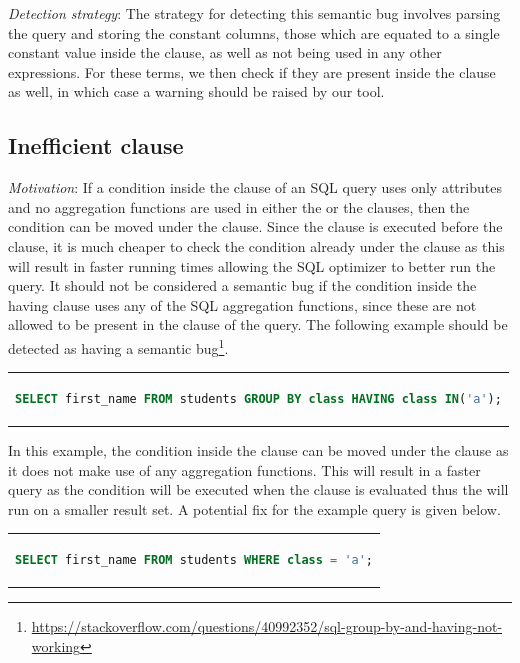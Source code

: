 \noindent \emph{Detection strategy}: The strategy for detecting this semantic bug involves parsing the query and storing the constant columns, those which are equated to a single constant value inside the  clause, as well as not being used in any other expressions. For these terms, we then check if they are present inside the  clause as well, in which case a warning should be raised by our tool.

\subsection{Inefficient  clause}
\emph{Motivation}: If a condition inside the  clause of an SQL query uses only  attributes and no aggregation functions are used in either the  or the  clauses, then the condition can be moved under the  clause. Since the  clause is executed before the  clause, it is much cheaper to check the condition already under the  clause as this will result in faster running times allowing the SQL optimizer to better run the query. It should not be considered a semantic bug if the condition inside the having clause uses any of the SQL aggregation functions, since these are not allowed to be present in the  clause of the query. The following example should be detected as having a semantic bug\footnote{\url{https://stackoverflow.com/questions/40992352/sql-group-by-and-having-not-working}}.

\begin{center}
\begin{tabular}{c}
\begin{lstlisting}[language=SQL]
SELECT first_name FROM students GROUP BY class HAVING class IN('a');
\end{lstlisting}
\end{tabular}
\end{center}

In this example, the  condition inside the  clause can be moved under the  clause as it does not make use of any aggregation functions. This will result in a faster query as the condition will be executed when the  clause is evaluated thus the  will run on a smaller result set. A potential fix for the example query is given below.

\begin{center}
\begin{tabular}{c}
\begin{lstlisting}[language=SQL]
SELECT first_name FROM students WHERE class = 'a';
\end{lstlisting}
\end{tabular}
\end{center}

